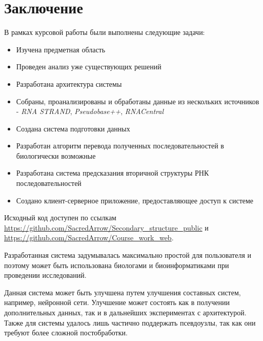 \documentclass[14pt]{matmex-diploma-custom}
\begin{document}
\section*{Заключение}
В рамках курсовой работы были выполнены следующие задачи:
\begin{itemize}
	\item Изучена предметная область
	\item Проведен анализ уже существующих решений
	\item Разработана архитектура системы
	\item Собраны, проанализированы и  обработаны данные из нескольких источников - \textit{RNA STRAND}, \textit{Pseudobase++}, \textit{RNACentral}
	\item Создана система подготовки данных
	\item Разработан алгоритм перевода полученных последовательностей в биологически возможные
	\item Разработана система предсказания вторичной структуры РНК последовательностей
	\item Создано клиент-серверное приложение, предоставляющее доступ к системе
\end{itemize} \par
Исходный код доступен по ссылкам \url{https://github.com/SacredArrow/Secondary_structure_public} и \url{https://github.com/SacredArrow/Course_work_web}.\par 
Разработанная система задумывалась максимально простой для пользователя и поэтому может быть использована биологами и биоинформатиками при проведении исследований. \par 
Данная система может быть улучшена путем улучшения составных систем, например, нейронной сети. Улучшение может состоять как в получении дополнительных данных, так и в дальнейших экспериментах с архитектурой. Также для системы удалось лишь частично поддержать псевдоузлы, так как они требуют более сложной постобработки.


\setmonofont[Mapping=tex-text]{CMU Typewriter Text}
% 


\end{document}
